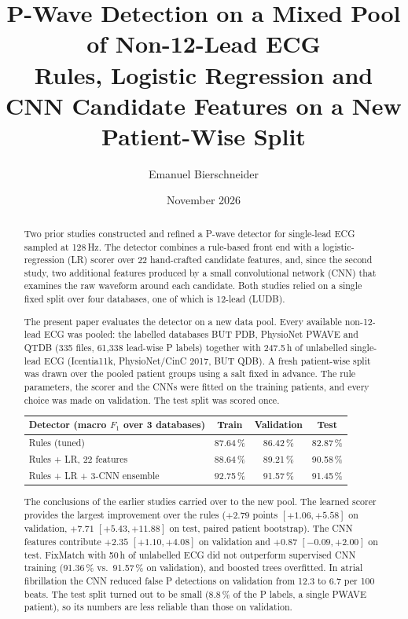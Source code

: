 \documentclass[11pt,a4paper]{article}
\title{P-Wave Detection on a Mixed Pool of Non-12-Lead ECG\\
\large Rules, Logistic Regression and CNN Candidate Features on a New Patient-Wise Split}
\author{Emanuel Bierschneider}
\date{November 2026}
\begin{document}
\maketitle

\begin{abstract}
\noindent
Two prior studies constructed and refined a P-wave detector for single-lead ECG sampled at 128\,Hz. The detector combines a rule-based front end with a logistic-regression (LR) scorer over 22 hand-crafted candidate features, and, since the second study, two additional features produced by a small convolutional network (CNN) that examines the raw waveform around each candidate. Both studies relied on a single fixed split over four databases, one of which is 12-lead (LUDB).

The present paper evaluates the detector on a new data pool. Every available non-12-lead ECG was pooled: the labelled databases BUT PDB, PhysioNet PWAVE and QTDB (335 files, 61,338 lead-wise P labels) together with 247.5\,h of unlabelled single-lead ECG (Icentia11k, PhysioNet/CinC 2017, BUT QDB). A fresh patient-wise split was drawn over the pooled patient groups using a salt fixed in advance. The rule parameters, the scorer and the CNNs were fitted on the training patients, and every choice was made on validation. The test split was scored once.

\medskip
\begin{center}
\begin{tabular}{lccc}
\toprule
Detector (macro $F_1$ over 3 databases) & Train & Validation & Test \\
\midrule
Rules (tuned) & 87.64\,\% & 86.42\,\% & 82.87\,\% \\
Rules + LR, 22 features & 88.64\,\% & 89.21\,\% & 90.58\,\% \\
Rules + LR + 3-CNN ensemble & 92.75\,\% & 91.57\,\% & 91.45\,\% \\
\bottomrule
\end{tabular}
\end{center}
\medskip

The conclusions of the earlier studies carried over to the new pool. The learned scorer provides the largest improvement over the rules ($+2.79$ points $[+1.06, +5.58]$ on validation, $+7.71$ $[+5.43, +11.88]$ on test, paired patient bootstrap). The CNN features contribute $+2.35$ $[+1.10, +4.08]$ on validation and $+0.87$ $[-0.09, +2.00]$ on test. FixMatch with 50\,h of unlabelled ECG did not outperform supervised CNN training (91.36\,\% vs.\ 91.57\,\% on validation), and boosted trees overfitted. In atrial fibrillation the CNN reduced false P detections on validation from 12.3 to 6.7 per 100 beats. The test split turned out to be small (8.8\,\% of the P labels, a single PWAVE patient), so its numbers are less reliable than those on validation.
\end{abstract}
\end{document}
